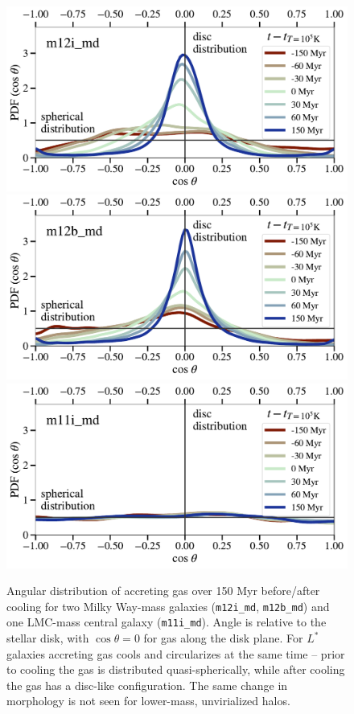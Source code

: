\documentclass[fleqn,usenatbib]{mnras}
\begin{document}
\begin{figure}
    \centering
    \includegraphics[width=\columnwidth]{figures/ang_dist_evolution/theta_vs_t_m12i_md.pdf}
    \includegraphics[width=\columnwidth]{figures/ang_dist_evolution/theta_vs_t_m12b_md.pdf}
    \includegraphics[width=\columnwidth]{figures/ang_dist_evolution/theta_vs_t_m11i_md.pdf}
    \caption{
    Angular distribution of accreting gas over 150 Myr before/after cooling for two Milky Way-mass galaxies (\texttt{m12i\_md}, \texttt{m12b\_md}) and one LMC-mass central galaxy (\texttt{m11i\_md}).
    Angle is relative to the stellar disk, with $\cos\theta=0$ for gas along the disk plane.
    For $L^*$ galaxies accreting gas cools and circularizes at the same time -- prior to cooling the gas is distributed quasi-spherically, while after cooling the gas has a disc-like configuration.
    The same change in morphology is not seen for lower-mass, unvirialized halos.
    }
    \label{f: theta vs t}
\end{figure}
\end{document}
